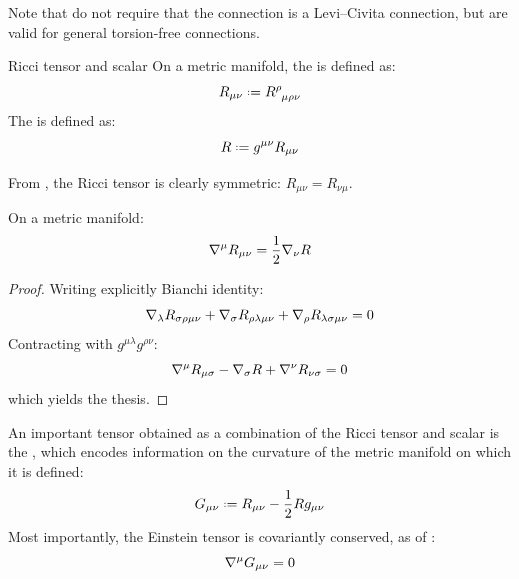 Note that  do not require that the connection is a Levi--Civita connection, but are valid for general torsion-free connections.

\begin{definition}{Ricci tensor and scalar}{}
  On a metric manifold, the  is defined as:
  \begin{equation}
    R_{\mu \nu} \defeq \tensor{R}{^\rho _{\mu \rho \nu}}
  \end{equation}
  The  is defined as:
  \begin{equation}
    R \defeq g^{\mu \nu} R_{\mu \nu}
  \end{equation}
\end{definition}

From , the Ricci tensor is clearly symmetric: $ R_{\mu \nu} = R_{\nu \mu} $.

\begin{proposition}{}{}
  On a metric manifold:
  \begin{equation}
    \nabla^\mu R_{\mu \nu} = \frac{1}{2} \nabla_\nu R
    \label{eq:ricci}
  \end{equation}
\end{proposition}

\begin{proofbox}
  \begin{proof}
    Writing explicitly Bianchi identity:
    \begin{equation*}
      \nabla_\lambda R_{\sigma \rho \mu \nu} + \nabla_\sigma R_{\rho \lambda \mu \nu} + \nabla_\rho R_{\lambda \sigma \mu \nu} = 0
    \end{equation*}
    Contracting with $ g^{\mu \lambda} g^{\rho \nu} $:
    \begin{equation*}
      \nabla^\mu R_{\mu \sigma} - \nabla_\sigma R + \nabla^\nu R_{\nu \sigma} = 0
    \end{equation*}
    which yields the thesis.
  \end{proof}
\end{proofbox}

An important tensor obtained as a combination of the Ricci tensor and scalar is the , which encodes information on the curvature of the metric manifold on which it is defined:
\begin{equation}
  G_{\mu \nu} \defeq R_{\mu \nu} - \frac{1}{2} R g_{\mu \nu}
  \label{eq:einstein-def}
\end{equation}
Most importantly, the Einstein tensor is covariantly conserved, as of :
\begin{equation}
  \nabla^\mu G_{\mu \nu} = 0
\end{equation}

